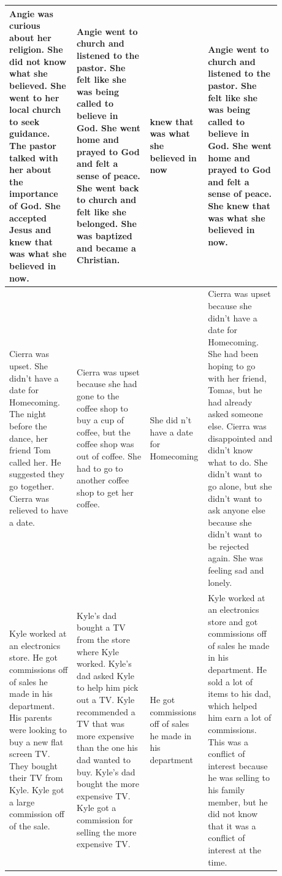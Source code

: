 \begin{table}[htp!]
\begin{tabular}{|p{0.24\linewidth}|p{0.26\linewidth}|p{0.12\linewidth}|p{0.26\linewidth}|}
Angie was curious about her religion. She did not know what she believed. She went to her local church to seek guidance. The pastor talked with her about the importance of God. She accepted Jesus and knew that was what she believed in now.
& Angie went to church and listened to the pastor. She felt like she was being called to believe in God. She went home and prayed to God and felt a sense of peace. She went back to church and felt like she belonged. She was baptized and became a Christian.
& knew that was what she believed in now
& Angie went to church and listened to the pastor. She felt like she was being called to believe in God. She went home and prayed to God and felt a sense of peace. She knew that was what she believed in now. \\ \hline

Cierra was upset. She didn't have a date for Homecoming. The night before the dance, her friend Tom called her. He suggested they go together. Cierra was relieved to have a date.
& Cierra was upset because she had gone to the coffee shop to buy a cup of coffee, but the coffee shop was out of coffee. She had to go to another coffee shop to get her coffee.
& She did n't have a date for Homecoming
& Cierra was upset because she didn't have a date for Homecoming. She had been hoping to go with her friend, Tomas, but he had already asked someone else. Cierra was disappointed and didn't know what to do. She didn't want to go alone, but she didn't want to ask anyone else because she didn't want to be rejected again. She was feeling sad and lonely. \\ \hline

Kyle worked at an electronics store. He got commissions off of sales he made in his department. His parents were looking to buy a new flat screen TV. They bought their TV from Kyle. Kyle got a large commission off of the sale.
& Kyle's dad bought a TV from the store where Kyle worked. Kyle's dad asked Kyle to help him pick out a TV. Kyle recommended a TV that was more expensive than the one his dad wanted to buy. Kyle's dad bought the more expensive TV. Kyle got a commission for selling the more expensive TV.
& He got commissions off of sales he made in his department
& Kyle worked at an electronics store and got commissions off of sales he made in his department. He sold a lot of items to his dad, which helped him earn a lot of commissions. This was a conflict of interest because he was selling to his family member, but he did not know that it was a conflict of interest at the time. \\ \hline


\end{tabular}
\end{table}
